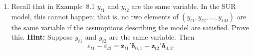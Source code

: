 \begin{enumerate}
\item Recall that in Example~8.1 $y_{t1}$ and $y_{t2}$ are the same variable. In the SUR model,
  this cannot happen; that is, no two elements of $(y_{t1}, y_{t2}, \ldots, y_{tM})$ are the same
  variable if the assumptions describing the model are satisfied. Prove this.
  \textbf{Hint:}
  Suppose $y_{t1}$ and $y_{t2}$ are the same variable. Then
  \[
    \varepsilon_{t1} - \varepsilon_{t2}
    = \mathbf{z}_{t1}'\boldsymbol{\delta}_{0,1} - \mathbf{z}_{t2}'\boldsymbol{\delta}_{0,2}.
  \]
\end{enumerate}
